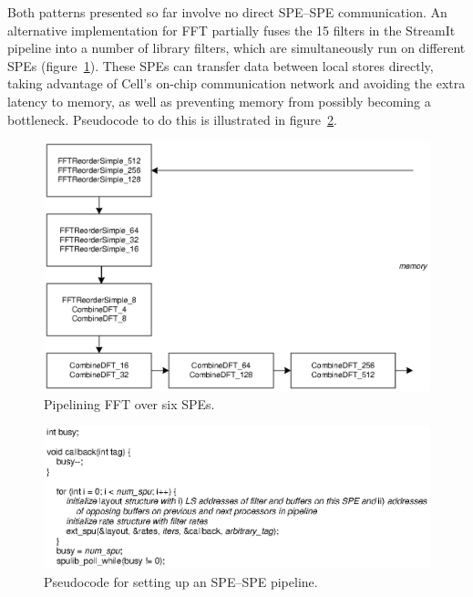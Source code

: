 Both patterns presented so far involve no direct SPE--SPE communication. An alternative implementation for FFT partially fuses the 15 filters in the StreamIt pipeline into a number of library filters, which are simultaneously run on different SPEs (figure~\ref{fig:use:spepipe}). These SPEs can transfer data between local stores directly, taking advantage of Cell's on-chip communication network and avoiding the extra latency to memory, as well as preventing memory from possibly becoming a bottleneck. Pseudocode to do this is illustrated in figure~\ref{fig:use:spepipecode}.

\begin{figure}[!htb]
\begin{center}
\includegraphics{figs/spepipe}
\end{center}
\caption{Pipelining FFT over six SPEs.}
\label{fig:use:spepipe}
\end{figure}

\begin{figure}[!htb]
\begin{center}
\includegraphics{figs/spepipecode}
\end{center}
\caption{Pseudocode for setting up an SPE--SPE pipeline.}
\label{fig:use:spepipecode}
\end{figure}

